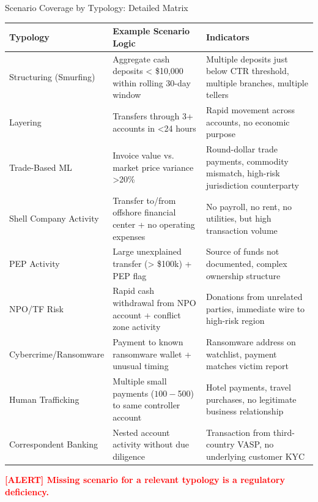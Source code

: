 \documentclass[11pt,a4paper]{beamer}
\newcommand{\redflag}[1]{\textcolor{red}{\textbf{[ALERT] #1}}}
\begin{document}
\begin{frame}{Scenario Coverage by Typology: Detailed Matrix}
	\begin{longtable}{p{}|p{}|p{}}
		\hline
		\rowcolor{lightgray}
		\textbf{Typology} & \textbf{Example Scenario Logic} & \textbf{Indicators} \\
		\hline
		Structuring (Smurfing) & Aggregate cash deposits < \$10,000 within rolling 30-day window & Multiple deposits just below CTR threshold, multiple branches, multiple tellers \\
		\hline
		Layering & Transfers through 3+ accounts in <24 hours & Rapid movement across accounts, no economic purpose \\
		\hline
		Trade-Based ML & Invoice value vs. market price variance >20\% & Round-dollar trade payments, commodity mismatch, high-risk jurisdiction counterparty \\
		\hline
		Shell Company Activity & Transfer to/from offshore financial center + no operating expenses & No payroll, no rent, no utilities, but high transaction volume \\
		\hline
		PEP Activity & Large unexplained transfer (> \$100k) + PEP flag & Source of funds not documented, complex ownership structure \\
		\hline
		NPO/TF Risk & Rapid cash withdrawal from NPO account + conflict zone activity & Donations from unrelated parties, immediate wire to high-risk region \\
		\hline
		Cybercrime/Ransomware & Payment to known ransomware wallet + unusual timing & Ransomware address on watchlist, payment matches victim report \\
		\hline
		Human Trafficking & Multiple small payments ($100-$500) to same controller account & Hotel payments, travel purchases, no legitimate business relationship \\
		\hline
		Correspondent Banking & Nested account activity without due diligence & Transaction from third-country VASP, no underlying customer KYC \\
		\hline
	\end{longtable}
	\redflag{Missing scenario for a relevant typology is a regulatory deficiency.}
\end{frame}
\end{document}
